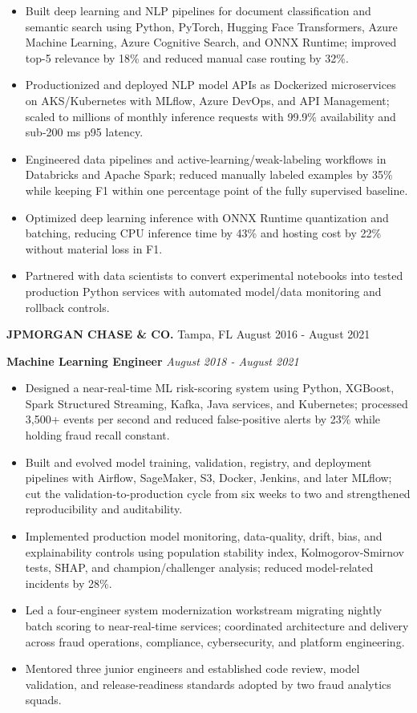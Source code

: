 \documentclass[10pt]{article}
\providecommand{\tightlist}{%
  \setlength{\itemsep}{0pt}\setlength{\parskip}{0pt}}
\begin{document}
\begin{itemize}
\tightlist
\item
  Built deep learning and NLP pipelines for document classification and
  semantic search using Python, PyTorch, Hugging Face Transformers,
  Azure Machine Learning, Azure Cognitive Search, and ONNX Runtime;
  improved top-5 relevance by 18\% and reduced manual case routing by
  32\%.
\item
  Productionized and deployed NLP model APIs as Dockerized microservices
  on AKS/Kubernetes with MLflow, Azure DevOps, and API Management;
  scaled to millions of monthly inference requests with 99.9\%
  availability and sub-200 ms p95 latency.
\item
  Engineered data pipelines and active-learning/weak-labeling workflows
  in Databricks and Apache Spark; reduced manually labeled examples by
  35\% while keeping F1 within one percentage point of the fully
  supervised baseline.
\item
  Optimized deep learning inference with ONNX Runtime quantization and
  batching, reducing CPU inference time by 43\% and hosting cost by 22\%
  without material loss in F1.
\item
  Partnered with data scientists to convert experimental notebooks into
  tested production Python services with automated model/data monitoring
  and rollback controls.
\end{itemize}

\textbf{JPMORGAN CHASE \& CO.} \textbar{} Tampa, FL \textbar{} August
2016 - August 2021

\textbf{Machine Learning Engineer} \textbar{} \emph{August 2018 - August
2021}

\begin{itemize}
\tightlist
\item
  Designed a near-real-time ML risk-scoring system using Python,
  XGBoost, Spark Structured Streaming, Kafka, Java services, and
  Kubernetes; processed 3,500+ events per second and reduced
  false-positive alerts by 23\% while holding fraud recall constant.
\item
  Built and evolved model training, validation, registry, and deployment
  pipelines with Airflow, SageMaker, S3, Docker, Jenkins, and later
  MLflow; cut the validation-to-production cycle from six weeks to two
  and strengthened reproducibility and auditability.
\item
  Implemented production model monitoring, data-quality, drift, bias,
  and explainability controls using population stability index,
  Kolmogorov-Smirnov tests, SHAP, and champion/challenger analysis;
  reduced model-related incidents by 28\%.
\item
  Led a four-engineer system modernization workstream migrating nightly
  batch scoring to near-real-time services; coordinated architecture and
  delivery across fraud operations, compliance, cybersecurity, and
  platform engineering.
\item
  Mentored three junior engineers and established code review, model
  validation, and release-readiness standards adopted by two fraud
  analytics squads.
\end{itemize}
\end{document}
